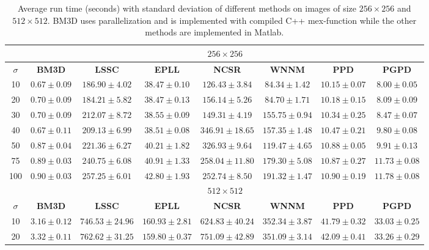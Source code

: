 \begin{table}
\begin{adjustwidth}{-2cm}{}
\caption{Average run time (seconds) with standard deviation of different methods on images of size $256\times 256$ and $512\times 512$. BM3D uses parallelization and is implemented with compiled C++ mex-function while the other methods are implemented in Matlab.}
\label{tab2-3}
\scriptsize
\begin{center}
\begin{tabular}{|c||c|c|c|c|c|c|c|}
\hline
&\multicolumn{7}{c|}{ $256 \times 256$}
\\
\hline
\hline
$\sigma$ &\textbf{BM3D}&\textbf{LSSC}&\textbf{EPLL}&\textbf{NCSR}&\textbf{WNNM}&\textbf{PPD}&\textbf{PGPD} 
\\
\hline
10  & $0.67\pm 0.09$  & $186.90\pm4.02$  & $38.47\pm0.10 $   & $126.43\pm3.84$   & $84.34\pm1.42$ &$10.15\pm0.07$ & $8.00\pm0.05$  
\\
\hline
20  &  $0.70\pm0.09$  & $184.21\pm5.82$   & $38.47\pm0.13$   &  $156.14\pm5.26$  &  $84.70\pm1.71$&$10.18\pm0.15$  &  $8.09\pm 0.09$             
\\
\hline 
30    &  $0.70 \pm 0.09$  &  $212.07\pm8.72$  & $38.55\pm0.09$  &  $149.31\pm4.19$  &  $155.75\pm0.94$ &$10.34\pm0.25$ &  $8.47\pm0.07$            
\\
\hline
40   &  $0.67\pm0.11$  &$209.13\pm6.99$ &  $38.51\pm0.08$  &  $346.91\pm18.65$  &  $157.35\pm1.48$&$10.47\pm0.21$  & $9.80\pm0.08$            
\\
\hline
50  &  $0.87\pm0.04$  &  $221.36\pm6.27$  &  $40.21\pm1.82 $  &  $326.93\pm9.64$  & $119.47\pm4.65$&$10.88\pm0.05$    &  $9.91\pm0.13$     
\\
\hline
75    & $0.89\pm0.03$ &  $240.75\pm6.08$  &   $40.91\pm1.33$ &  $258.04\pm11.80$  & $ 179.30\pm5.08$ &$10.87\pm0.27$  &   $11.73\pm0.08$  
\\
\hline
100  &  $0.90\pm0.03$  &  $257.25\pm6.01 $  &$42.80\pm 1.93$  & $252.74\pm8.50$   &  $191.32\pm 1.47$  &$10.90\pm0.19$ &  $11.78\pm0.08$     
\\
\hline
\hline
&\multicolumn{7}{c|}{ $512 \times 512$}
\\
\hline
\hline
$\sigma$ &\textbf{BM3D}&\textbf{LSSC}&\textbf{EPLL}&\textbf{NCSR}&\textbf{WNNM}&\textbf{PPD}&\textbf{PGPD} 
\\
\hline
10  &$3.16\pm0.12$ & $746.53\pm24.96$  &  $160.93\pm2.81$  & $624.83\pm40.24$   &  $352.34\pm3.87$&$41.79\pm0.32$  &  $33.03\pm0.25$   
\\
\hline
20 &$3.32\pm0.11$ & $762.62\pm31.25$  &  $159.80\pm0.37$  & $751.09\pm42.89$   &  $351.09\pm3.14$ &$42.09\pm0.41$ &  $33.26\pm0.29$   

\end{tabular}
\end{center}
\end{adjustwidth}
\end{table}
